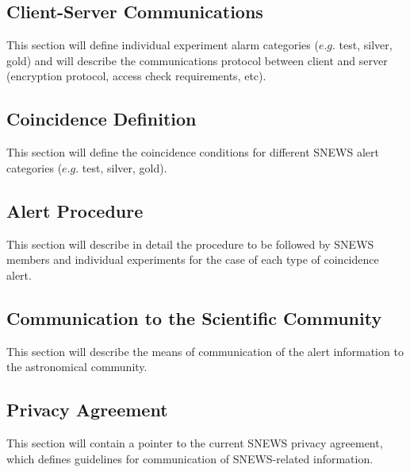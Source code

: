 \documentclass{article}
\begin{document}

\subsection{Client-Server Communications}

This section will define individual experiment alarm categories 
($e.g.$ test, silver, gold) and will describe the 
communications protocol between client and server (encryption
protocol, access check requirements, etc).

\subsection{Coincidence Definition}

This section will define the coincidence conditions for different
SNEWS alert categories ($e.g.$ test, silver, gold).

\subsection{Alert Procedure}

This section will describe in detail the procedure to be followed by
SNEWS members and individual experiments for the case of each type of
coincidence alert.

\subsection{Communication to the Scientific Community}

This section will describe the means of communication
of the alert information to the astronomical community.

\subsection{Privacy Agreement}
This section will contain a pointer to the current SNEWS privacy
agreement, which defines guidelines for communication
of SNEWS-related information.
\end{document}
